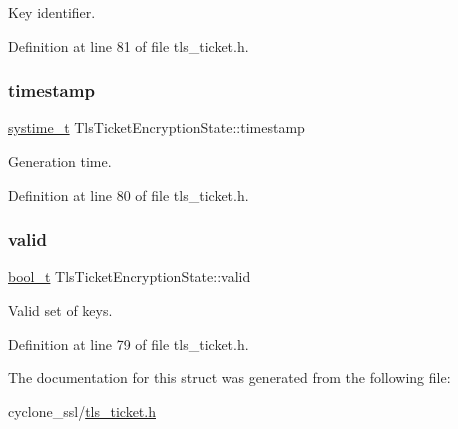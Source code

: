 Key identifier. 



Definition at line 81 of file tls\+\_\+ticket.\+h.

\mbox{\label{structTlsTicketEncryptionState_acd1f7694dc380aa6ff954dce48bfa9ce}} 
\subsubsection{\texorpdfstring{timestamp}{timestamp}}
{\footnotesize\ttfamily \hyperlink{compiler__port_8h_ae3e32a98d431a02106616da3071832dd}{systime\+\_\+t} Tls\+Ticket\+Encryption\+State\+::timestamp}



Generation time. 



Definition at line 80 of file tls\+\_\+ticket.\+h.

\mbox{\label{structTlsTicketEncryptionState_ac32d4eacdd76de6fc7e4ba33deb03928}} 
\subsubsection{\texorpdfstring{valid}{valid}}
{\footnotesize\ttfamily \hyperlink{compiler__port_8h_a812d16e5494522586b3784e55d479912}{bool\+\_\+t} Tls\+Ticket\+Encryption\+State\+::valid}



Valid set of keys. 



Definition at line 79 of file tls\+\_\+ticket.\+h.



The documentation for this struct was generated from the following file\+:\begin{DoxyCompactItemize}
\item 
cyclone\+\_\+ssl/\hyperlink{tls__ticket_8h}{tls\+\_\+ticket.\+h}\end{DoxyCompactItemize}

